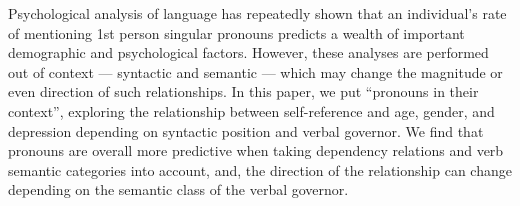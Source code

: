 Psychological analysis of language has repeatedly shown that an individual's rate of mentioning 1st person singular pronouns predicts a wealth of important demographic and psychological factors. However, these analyses are performed out of context --- syntactic and semantic --- which may change the magnitude or even direction of such relationships.  In this paper, we put ``pronouns in their context'', exploring the relationship between self-reference and age, gender, and depression depending on syntactic position and verbal governor. We find that pronouns are overall more predictive when taking dependency relations and verb semantic categories into account, and, the direction of the relationship can change depending on the semantic class of the verbal governor.
